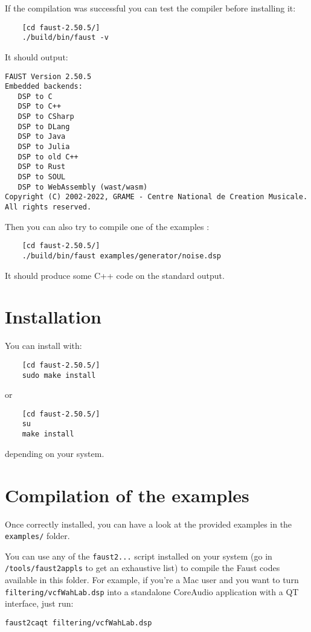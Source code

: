 If the compilation was successful you can test the compiler before installing it:
\begin{lstlisting}
	[cd faust-2.50.5/]
	./build/bin/faust -v
\end{lstlisting}
It should output:
\begin{lstlisting}
FAUST Version 2.50.5
Embedded backends: 
   DSP to C
   DSP to C++
   DSP to CSharp
   DSP to DLang
   DSP to Java
   DSP to Julia
   DSP to old C++
   DSP to Rust
   DSP to SOUL
   DSP to WebAssembly (wast/wasm)
Copyright (C) 2002-2022, GRAME - Centre National de Creation Musicale. All rights reserved. 
\end{lstlisting}

Then you can also try to compile one of the examples :
\begin{lstlisting}
	[cd faust-2.50.5/]
	./build/bin/faust examples/generator/noise.dsp
\end{lstlisting}
It should produce some C++ code on the standard output.

\section{Installation}
You can install \faust with:
\begin{lstlisting}
	[cd faust-2.50.5/]
	sudo make install
\end{lstlisting}
or
\begin{lstlisting}
	[cd faust-2.50.5/]
	su
	make install
\end{lstlisting}
depending on your system.

\section{Compilation of the examples}

Once \faust correctly installed, you can have a look at the provided examples in the \lstinline'examples/' folder. 

You can use any of the \lstinline'faust2...' script installed on your system (go in \lstinline'/tools/faust2appls' to get an exhaustive list) to compile the Faust codes available in this folder. For example, if you're a Mac user and you want to turn \lstinline'filtering/vcfWahLab.dsp' into a standalone CoreAudio application with a QT interface, just run:

\lstinline'faust2caqt filtering/vcfWahLab.dsp'

